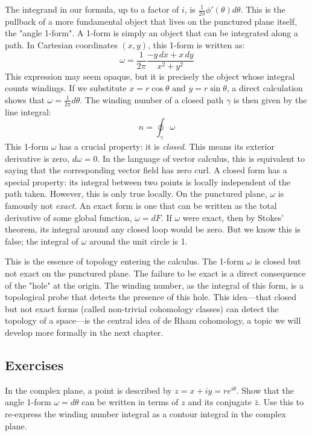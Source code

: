 The integrand in our formula, up to a factor of $i$, is $\frac{1}{2\pi} \phi'(\theta) d\theta$.
This is the pullback of a more fundamental object that lives on the punctured plane itself, the "angle 1-form".
A 1-form is simply an object that can be integrated along a path.
In Cartesian coordinates $(x,y)$, this 1-form is written as:
\begin{equation}
    \omega = \frac{1}{2\pi} \frac{-y\,dx + x\,dy}{x^2 + y^2}
\end{equation}
This expression may seem opaque, but it is precisely the object whose integral counts windings.
If we substitute $x = r\cos\theta$ and $y=r\sin\theta$, a direct calculation shows that $\omega = \frac{1}{2\pi}d\theta$.
The winding number of a closed path $\gamma$ is then given by the line integral:
\begin{equation}
    n = \oint_\gamma \omega
\end{equation}
This 1-form $\omega$ has a crucial property: it is \textit{closed}.
This means its exterior derivative is zero, $d\omega = 0$.
In the language of vector calculus, this is equivalent to saying that the corresponding vector field has zero curl.
A closed form has a special property: its integral between two points is locally independent of the path taken.
However, this is only true locally.
On the punctured plane, $\omega$ is famously not \textit{exact}.
An exact form is one that can be written as the total derivative of some global function, $\omega = dF$.
If $\omega$ were exact, then by Stokes' theorem, its integral around any closed loop would be zero.
But we know this is false; the integral of $\omega$ around the unit circle is 1.

This is the essence of topology entering the calculus.
The 1-form $\omega$ is closed but not exact on the punctured plane.
The failure to be exact is a direct consequence of the "hole" at the origin.
The winding number, as the integral of this form, is a topological probe that detects the presence of this hole.
This idea---that closed but not exact forms (called non-trivial cohomology classes) can detect the topology of a space---is the central idea of de Rham cohomology, a topic we will develop more formally in the next chapter.

\subsection*{Exercises}

\begin{exercise}
    In the complex plane, a point is described by $z = x+iy = re^{i\theta}$.
    Show that the angle 1-form $\omega = d\theta$ can be written in terms of $z$ and its conjugate $\bar{z}$.
    Use this to re-express the winding number integral as a contour integral in the complex plane.
\end{exercise}

